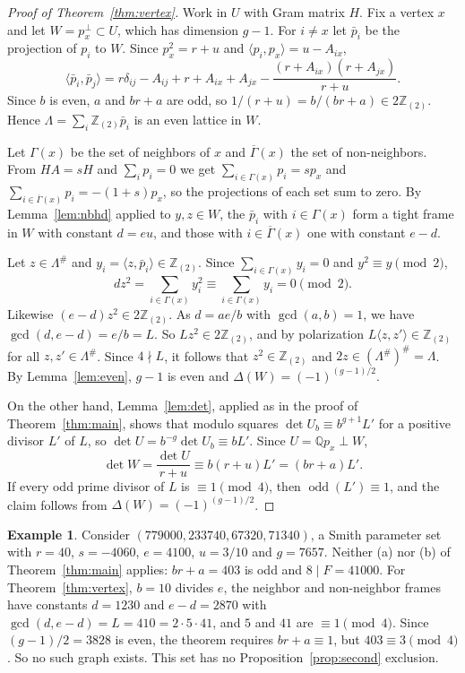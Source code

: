 \documentclass[11pt]{article}
\theoremstyle{definition}
\newtheorem{example}[theorem]{Example}
\theoremstyle{remark}
\newcommand{\Z}{\mathbb Z}
\newcommand{\Q}{\mathbb Q}
\newcommand{\Zt}{\Z_{(2)}}
\newcommand{\ip}[2]{\langle #1,#2\rangle}
\newcommand{\odd}{\operatorname{odd}}
\begin{document}
\begin{proof}[Proof of Theorem~\ref{thm:vertex}]
Work in $U$ with Gram matrix $H$. Fix a vertex $x$ and let $W=p_x^\perp\subset U$,
which has dimension $g-1$. For $i\neq x$ let $\bar p_i$ be the projection of
$p_i$ to $W$. Since $p_x^2=r+u$ and $\ip{p_i}{p_x}=u-A_{ix}$,
\[
 \ip{\bar p_i}{\bar p_j}=r\delta_{ij}-A_{ij}+r+A_{ix}+A_{jx}
 -\frac{(r+A_{ix})(r+A_{jx})}{r+u}.
\]
Since $b$ is even, $a$ and $br+a$ are odd, so $1/(r+u)=b/(br+a)\in2\Zt$. Hence
$\Lambda=\sum_i\Zt\bar p_i$ is an even lattice in $W$.

Let $\Gamma(x)$ be the set of neighbors of $x$ and $\overline\Gamma(x)$ the set
of non-neighbors. From $HA=sH$ and $\sum_ip_i=0$ we get
$\sum_{i\in\Gamma(x)}p_i=sp_x$ and $\sum_{i\in\overline\Gamma(x)}p_i=-(1+s)p_x$,
so the projections of each set sum to zero. By Lemma~\ref{lem:nbhd} applied to
$y,z\in W$, the $\bar p_i$ with $i\in\Gamma(x)$ form a tight frame in $W$ with
constant $d=eu$, and those with $i\in\overline\Gamma(x)$ one with constant
$e-d$.

Let $z\in \Lambda^\#$ and $y_i=\ip z{\bar p_i}\in\Zt$. Since
$\sum_{i\in\Gamma(x)}y_i=0$ and $y^2\equiv y\pmod 2$,
\[
 dz^2=\sum_{i\in\Gamma(x)}y_i^2\equiv\sum_{i\in\Gamma(x)}y_i=0\pmod 2 .
\]
Likewise $(e-d)z^2\in2\Zt$. As $d=ae/b$ with $\gcd(a,b)=1$, we have
$\gcd(d,e-d)=e/b=L$. So $Lz^2\in2\Zt$, and by polarization
$L\ip z{z'}\in\Zt$ for all $z,z'\in \Lambda^\#$. Since $4\nmid L$, it follows that
$z^2\in\Zt$ and $2z\in(\Lambda^\#)^\#=\Lambda$. By Lemma~\ref{lem:even}, $g-1$ is even and
$\Delta(W)=(-1)^{(g-1)/2}$.

On the other hand, Lemma~\ref{lem:det}, applied as in the proof of
Theorem~\ref{thm:main}, shows that modulo squares $\det U_b\equiv b^{g+1}L'$
for a positive divisor $L'$ of $L$, so $\det U=b^{-g}\det U_b\equiv bL'$.
Since $U=\Q p_x\perp W$,
\[
 \det W=\frac{\det U}{r+u}\equiv b(r+u)L'=(br+a)L'.
\]
If every odd prime divisor of $L$ is $\equiv1\pmod4$, then
$\odd(L')\equiv1$, and the claim follows from
$\Delta(W)=(-1)^{(g-1)/2}$.
\end{proof}

\begin{example}\label{ex:779000}
Consider $(779000,233740,67320,71340)$, a Smith parameter set with $r=40$,
$s=-4060$, $e=4100$, $u=3/10$ and $g=7657$. Neither (a) nor (b) of
Theorem~\ref{thm:main} applies: $br+a=403$ is odd and $8\mid F=41000$. For Theorem~\ref{thm:vertex},
$b=10$ divides $e$, the neighbor and non-neighbor frames have constants
$d=1230$ and $e-d=2870$ with $\gcd(d,e-d)=L=410=2\cdot5\cdot41$, and $5$ and $41$ are
$\equiv1\pmod4$. Since $(g-1)/2=3828$ is even, the theorem requires
$br+a\equiv1$, but $403\equiv3\pmod 4$. So no such graph exists. This set has
no Proposition~\ref{prop:second} exclusion.
\end{example}
\end{document}
